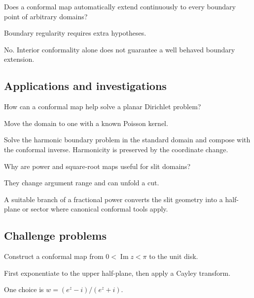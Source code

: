 \begin{exercise}\label{exr:iv17-expand-12}
Does a conformal map automatically extend continuously to every boundary point of arbitrary domains?
\end{exercise}
\begin{hint}
Boundary regularity requires extra hypotheses.
\end{hint}
\begin{solution}
No. Interior conformality alone does not guarantee a well behaved boundary extension.
\end{solution}

\subsection*{Applications and investigations}

\begin{exercise}\label{exr:iv17-expand-13}
How can a conformal map help solve a planar Dirichlet problem?
\end{exercise}
\begin{hint}
Move the domain to one with a known Poisson kernel.
\end{hint}
\begin{solution}
Solve the harmonic boundary problem in the standard domain and compose with the conformal inverse. Harmonicity is preserved by the coordinate change.
\end{solution}

\begin{exercise}\label{exr:iv17-expand-14}
Why are power and square-root maps useful for slit domains?
\end{exercise}
\begin{hint}
They change argument range and can unfold a cut.
\end{hint}
\begin{solution}
A suitable branch of a fractional power converts the slit geometry into a half-plane or sector where canonical conformal tools apply.
\end{solution}

\subsection*{Challenge problems}

\begin{exercise}\label{exr:iv17-expand-15}
Construct a conformal map from \(0<\operatorname{Im}z<\pi\) to the unit disk.
\end{exercise}
\begin{hint}
First exponentiate to the upper half-plane, then apply a Cayley transform.
\end{hint}
\begin{solution}
One choice is \(w=(e^z-i)/(e^z+i)\).
\end{solution}

